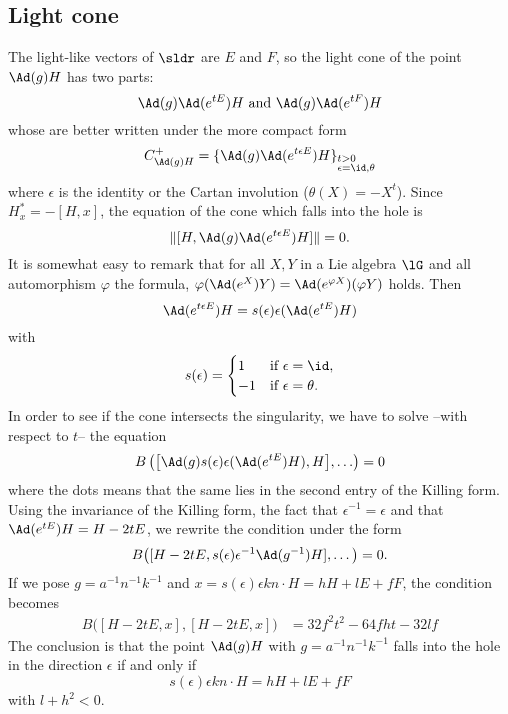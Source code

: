 \subsection{Light cone}

The light-like vectors of $\sldr$ are $E$ and $F$, so the light cone of the point $\Ad(g)H$ has two parts:
\[
\Ad(g)\Ad(e^{tE})H\text{ and } \Ad(g)\Ad(e^{tF})H
\]
whose are better written under the more compact form
\begin{equation}
C^+_{\Ad(g)H}=\{\Ad(g)\Ad(e^{t\epsilon E})H\}_{%
\begin{subarray}{l}
t>0\\
\epsilon=\id,\theta
\end{subarray}
}
\end{equation}
where $\epsilon$ is the identity or the Cartan involution ($\theta(X)=-X^t$). Since $H^*_x=-[H,x]$, the equation of the cone which falls into the hole is
\begin{equation}
\|[H,\Ad(g)\Ad(e^{t\epsilon E})H]\|=0.
\end{equation}
It is somewhat easy to remark that for all $X,Y$ in a Lie algebra $\lG$ and all automorphism $\varphi$ the formula, $\varphi(\Ad(e^X)Y)=\Ad(e^{\varphi X})(\varphi Y)$ holds.
Then
\begin{equation}
\Ad(e^{t\epsilon E})H=s(\epsilon)\epsilon(\Ad(e^{tE})H)
\end{equation}
with 
\[
  s(\epsilon)=
\begin{cases}
1&\text{if $\epsilon=\id$},\\
-1&\text{if $\epsilon=\theta$}.
\end{cases}
\]
In order to see if the cone intersects the singularity, we have to solve --with respect to $t$-- the equation
\begin{equation}
B
\left(%
\big[  \Ad(g)s(\epsilon)\epsilon(\Ad(e^{tE})H),H\big],\ldots
\right)=0
\end{equation}
where the dots means that the same lies in the second entry of the Killing form. Using the invariance of the Killing form, the fact that $\epsilon^{-1}=\epsilon$ and  that $\Ad(e^{tE})H=H-2tE$, we rewrite the condition under the form
\begin{equation}
	B\big(	[H-2tE,s(\epsilon)\epsilon^{-1}\Ad(g^{-1})H],\ldots\big)=0.
\end{equation}
If we pose $g=a^{-1} n^{-1} k^{-1}$ and $x=s(\epsilon)\epsilon kn\cdot H=hH+lE+fF$, the condition becomes
\begin{equation}
\begin{split}
	B\big( [H-2tE,x],[H-2tE,x] \big)&=32f^2t^2-64fht-32lf
\end{split}
\end{equation}
The conclusion is that the point $\Ad(g)H$ with $g=a^{-1} n^{-1} k^{-1}$ falls into the hole in the direction $\epsilon$ if and only if
\[
 s(\epsilon)\epsilon kn\cdot H=hH+lE+fF
\]
with $l+h^2<0$.


